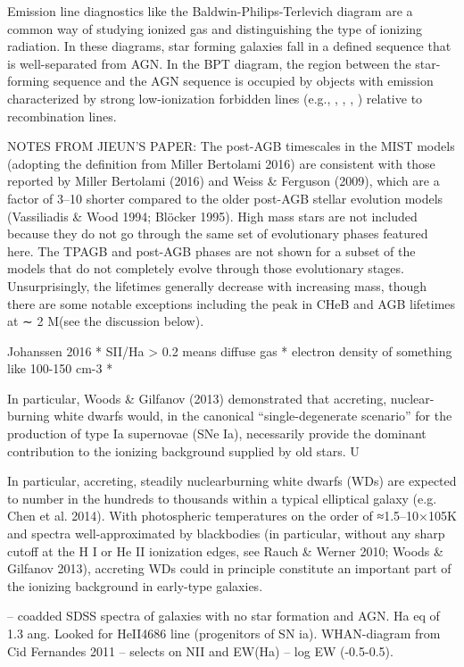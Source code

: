 Emission line diagnostics like the Baldwin-Philips-Terlevich diagram \citep[BPT; ][]{BPT} are a common way of studying ionized gas and distinguishing the type of ionizing radiation. In these diagrams, star forming galaxies fall in a defined sequence that is well-separated from AGN. In the BPT diagram, the region between the star-forming sequence and the AGN sequence is occupied by objects with emission characterized by strong low-ionization forbidden lines (e.g., \nii{}, \sii{}, \oii{}, \oi{}) relative to recombination lines.


NOTES FROM JIEUN'S PAPER:
The post-AGB timescales in the MIST models (adopting the definition from Miller Bertolami 2016) are consistent with those reported by Miller Bertolami (2016) and Weiss & Ferguson (2009), which are a factor of 3–10 shorter compared to the older post-AGB stellar evolution models (Vassiliadis & Wood 1994; Blöcker 1995). High mass stars are not included because they do not go through the same set of evolutionary phases featured here. The TPAGB and post-AGB phases are not shown for a subset of the models that do not completely evolve through those evolutionary stages. Unsurprisingly, the lifetimes generally decrease with increasing mass, though there are some notable exceptions including the peak in CHeB and AGB lifetimes at ∼ 2 M(see the discussion below).


Johanssen 2016
* SII/Ha > 0.2 means diffuse gas
* electron density of something like 100-150 cm-3
*

In particular, Woods & Gilfanov (2013) demonstrated
that accreting, nuclear-burning white dwarfs would, in the
canonical “single-degenerate scenario” for the production of
type Ia supernovae (SNe Ia), necessarily provide the dominant
contribution to the ionizing background supplied by
old stars. U

In particular, accreting, steadily nuclearburning
white dwarfs (WDs) are expected to number in the
hundreds to thousands within a typical elliptical galaxy (e.g.
Chen et al. 2014). With photospheric temperatures on the
order of ≈1.5–10×105K and spectra well-approximated by
blackbodies (in particular, without any sharp cutoff at the
H I or He II ionization edges, see Rauch & Werner 2010;
Woods & Gilfanov 2013), accreting WDs could in principle
constitute an important part of the ionizing background in
early-type galaxies.

\citet{Johansson+2016} -- coadded SDSS spectra of galaxies with no star formation and AGN. Ha eq of 1.3 ang. Looked for HeII4686 line (progenitors of SN ia).
WHAN-diagram from Cid Fernandes 2011 -- selects on NII and EW(Ha) -- log EW (-0.5-0.5).

